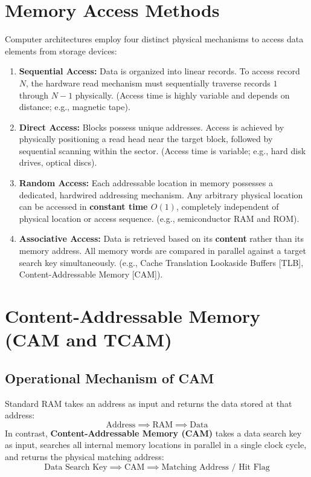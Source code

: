 \section{Memory Access Methods}
\label{sec:memory_access_methods}

Computer architectures employ four distinct physical mechanisms to access data elements from storage devices:
\begin{enumerate}[label=\bfseries\arabic*.]
    \item \textbf{Sequential Access:} Data is organized into linear records. To access record $N$, the hardware read mechanism must sequentially traverse records $1$ through $N-1$ physically. (Access time is highly variable and depends on distance; e.g., magnetic tape).
    \item \textbf{Direct Access:} Blocks possess unique addresses. Access is achieved by physically positioning a read head near the target block, followed by sequential scanning within the sector. (Access time is variable; e.g., hard disk drives, optical discs).
    \item \textbf{Random Access:} Each addressable location in memory possesses a dedicated, hardwired addressing mechanism. Any arbitrary physical location can be accessed in \textbf{constant time $O(1)$}, completely independent of physical location or access sequence. (e.g., semiconductor RAM and ROM).
    \item \textbf{Associative Access:} Data is retrieved based on its \textbf{content} rather than its memory address. All memory words are compared in parallel against a target search key simultaneously. (e.g., Cache Translation Lookaside Buffers [TLB], Content-Addressable Memory [CAM]).
\end{enumerate}


\section{Content-Addressable Memory (CAM and TCAM)}
\label{sec:cam_tcam}

\subsection{Operational Mechanism of CAM}
Standard RAM takes an address as input and returns the data stored at that address:
\[ \text{Address} \implies \text{RAM} \implies \text{Data} \]
In contrast, \textbf{Content-Addressable Memory (CAM)} takes a data search key as input, searches all internal memory locations in parallel in a single clock cycle, and returns the physical matching address:
\[ \text{Data Search Key} \implies \text{CAM} \implies \text{Matching Address / Hit Flag} \]

